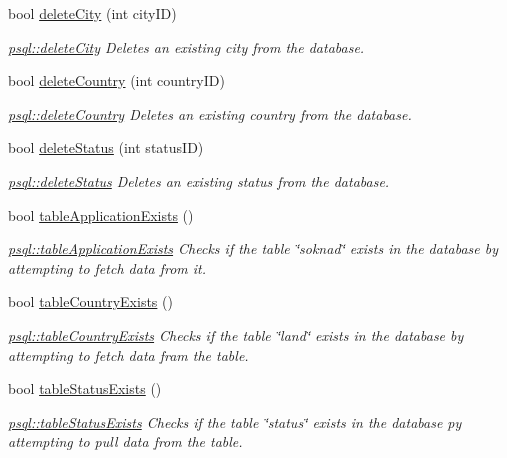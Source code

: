 \begin{DoxyCompactItemize}
bool \mbox{\hyperlink{classpsql_aaffd42b26b635d9881daaf5fbf4fd62f}{delete\+City}} (int city\+ID)
\begin{DoxyCompactList}\small\item\em \mbox{\hyperlink{classpsql_aaffd42b26b635d9881daaf5fbf4fd62f}{psql\+::delete\+City}} Deletes an existing city from the database. \end{DoxyCompactList}\item 
bool \mbox{\hyperlink{classpsql_a914bf8701fbed4ff80edcd0d09c7c3fd}{delete\+Country}} (int country\+ID)
\begin{DoxyCompactList}\small\item\em \mbox{\hyperlink{classpsql_a914bf8701fbed4ff80edcd0d09c7c3fd}{psql\+::delete\+Country}} Deletes an existing country from the database. \end{DoxyCompactList}\item 
bool \mbox{\hyperlink{classpsql_a26fc592cfb9f484e1bee62af527f2b95}{delete\+Status}} (int status\+ID)
\begin{DoxyCompactList}\small\item\em \mbox{\hyperlink{classpsql_a26fc592cfb9f484e1bee62af527f2b95}{psql\+::delete\+Status}} Deletes an existing status from the database. \end{DoxyCompactList}\item 
bool \mbox{\hyperlink{classpsql_a117b616053845f1b7295b21a06f008fd}{table\+Application\+Exists}} ()
\begin{DoxyCompactList}\small\item\em \mbox{\hyperlink{classpsql_a117b616053845f1b7295b21a06f008fd}{psql\+::table\+Application\+Exists}} Checks if the table \char`\"{}soknad\char`\"{} exists in the database by attempting to fetch data from it. \end{DoxyCompactList}\item 
bool \mbox{\hyperlink{classpsql_ae0ab0012c58471bd3fd63c286fb22224}{table\+Country\+Exists}} ()
\begin{DoxyCompactList}\small\item\em \mbox{\hyperlink{classpsql_ae0ab0012c58471bd3fd63c286fb22224}{psql\+::table\+Country\+Exists}} Checks if the table \char`\"{}land\char`\"{} exists in the database by attempting to fetch data fram the table. \end{DoxyCompactList}\item 
bool \mbox{\hyperlink{classpsql_a3f8bac89bd0cee3af77e47e5c555543d}{table\+Status\+Exists}} ()
\begin{DoxyCompactList}\small\item\em \mbox{\hyperlink{classpsql_a3f8bac89bd0cee3af77e47e5c555543d}{psql\+::table\+Status\+Exists}} Checks if the table \char`\"{}status\char`\"{} exists in the database py attempting to pull data from the table. \end{DoxyCompactList}\item 

\end{DoxyCompactItemize}
